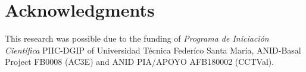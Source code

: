 \documentclass[review]{elsarticle}
\begin{document}













\section*{Acknowledgments}
This research was possible due to the funding of \textit{Programa de Iniciaci\'on Cient\'ifica} PIIC-DGIP of Universidad T\'ecnica Feder\'ico Santa Mar\'ia, ANID-Basal Project FB0008 (AC3E) and ANID PIA/APOYO AFB180002 (CCTVal).


\end{document}
